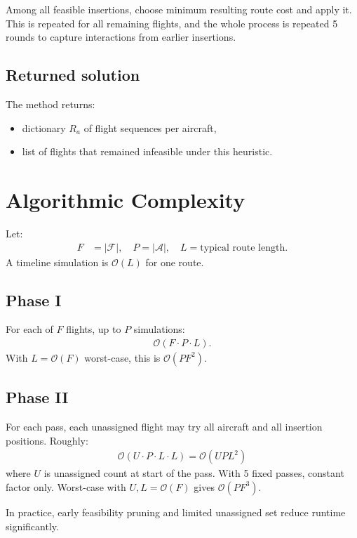 \documentclass[11pt,a4paper]{article}
\begin{document}
Among all feasible insertions, choose minimum resulting route cost and apply it. This is repeated for all remaining flights, and the whole process is repeated 5 rounds to capture interactions from earlier insertions.

\subsection{Returned solution}
The method returns:
\begin{itemize}[leftmargin=1.4em]
    \item dictionary $R_a$ of flight sequences per aircraft,
    \item list of flights that remained infeasible under this heuristic.
\end{itemize}

\section{Algorithmic Complexity}
Let:
\begin{align*}
F &= |\mathcal{F}|, \quad P = |\mathcal{A}|, \quad L = \text{typical route length}.
\end{align*}
A timeline simulation is $\mathcal{O}(L)$ for one route.

\subsection{Phase I}
For each of $F$ flights, up to $P$ simulations:
\begin{align*}
\mathcal{O}(F \cdot P \cdot L).
\end{align*}
With $L=\mathcal{O}(F)$ worst-case, this is $\mathcal{O}(P F^2)$.

\subsection{Phase II}
For each pass, each unassigned flight may try all aircraft and all insertion positions. Roughly:
\begin{align*}
\mathcal{O}(U \cdot P \cdot L \cdot L) = \mathcal{O}(U P L^2)
\end{align*}
where $U$ is unassigned count at start of the pass. With 5 fixed passes, constant factor only. Worst-case with $U,L=\mathcal{O}(F)$ gives $\mathcal{O}(P F^3)$.

In practice, early feasibility pruning and limited unassigned set reduce runtime significantly.
\end{document}
